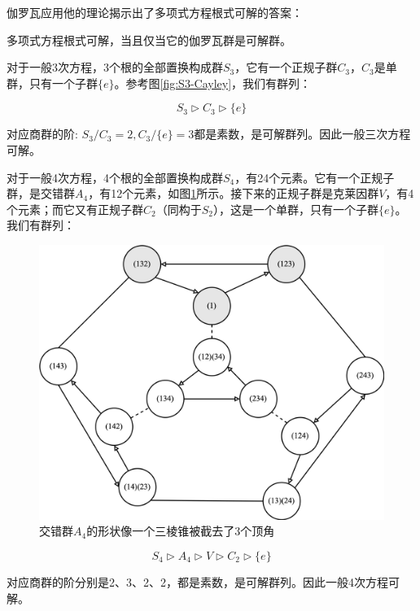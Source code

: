 \documentclass[b5paper]{ctexart}
\begin{document}
伽罗瓦应用他的理论揭示出了多项式方程根式可解的答案：

\begin{theorem}
多项式方程根式可解，当且仅当它的伽罗瓦群是可解群。
\end{theorem}

对于一般3次方程，3个根的全部置换构成群$S_3$，它有一个正规子群$C_3$，$C_3$是单群，只有一个子群$\{e\}$。参考图\ref{fig:S3-Cayley}，我们有群列：

\[
S_3 \rhd C_3 \rhd \{e\}
\]

对应商群的阶: $S_3/C_3 = 2, C_3/\{e\} = 3$都是素数，是可解群列。因此一般三次方程可解。

对于一般4次方程，4个根的全部置换构成群$S_4$，有24个元素。它有一个正规子群，是交错群$A_4$，有12个元素，如图\ref{fig:A4-Cayley}所示。接下来的正规子群是克莱因群$V$，有4个元素；而它又有正规子群$C_2$（同构于$S_2$），这是一个单群，只有一个子群$\{e\}$。我们有群列：

\begin{figure}[htbp]
 \centering
 \includegraphics[scale=0.4]{img/A4-Cayley}
 \caption{交错群$A_4$的形状像一个三棱锥被截去了3个顶角}
 \label{fig:A4-Cayley}
\end{figure}

\[
S_4 \rhd A_4 \rhd V \rhd C_2 \rhd \{e\}
\]

对应商群的阶分别是2、3、2、2，都是素数，是可解群列。因此一般4次方程可解。
\end{document}
